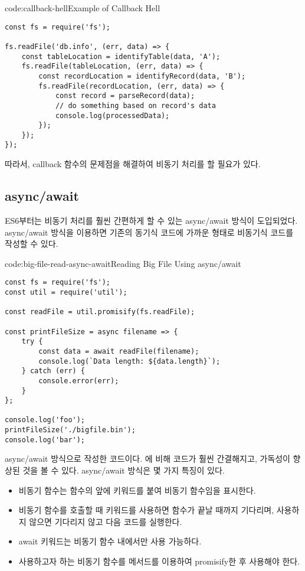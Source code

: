 \begin{codeenv}{code:callback-hell}{Example of Callback Hell}\begin{verbatim}
const fs = require('fs');

fs.readFile('db.info', (err, data) => {
    const tableLocation = identifyTable(data, 'A');
    fs.readFile(tableLocation, (err, data) => {
        const recordLocation = identifyRecord(data, 'B');
        fs.readFile(recordLocation, (err, data) => {
            const record = parseRecord(data);
            // do something based on record's data
            console.log(processedData);
        });
    });
});
\end{verbatim}
\end{codeenv}

따라서, callback 함수의 문제점을 해결하여 비동기 처리를 할 필요가 있다. 

\subsection*{async/await}

ES6부터는 비동기 처리를 훨씬 간편하게 할 수 있는 async/await 방식이 도입되었다. async/await 방식을 이용하면 기존의 동기식 코드에 가까운 형태로 비동기식 코드를 작성할 수 있다.

\begin{codeenv}{code:big-file-read-async-await}{Reading Big File Using async/await}\begin{verbatim}
const fs = require('fs');
const util = require('util');

const readFile = util.promisify(fs.readFile);

const printFileSize = async filename => {
    try {
        const data = await readFile(filename);
        console.log(`Data length: ${data.length}`);
    } catch (err) {
        console.error(err);
    }
};

console.log('foo');
printFileSize('./bigfile.bin');
console.log('bar');
\end{verbatim}
\end{codeenv}

\은 \를 async/await 방식으로 작성한 코드이다. 에 비해 코드가 훨씬 간결해지고, 가독성이 향상된 것을 볼 수 있다. async/await 방식은 몇 가지 특징이 있다. 

\begin{itemize}
    \item 비동기 함수는 함수의 앞에  키워드를 붙여 비동기 함수임을 표시한다.
    \item 비동기 함수를 호출할 때  키워드를 사용하면 함수가 끝날 때까지 기다리며, 사용하지 않으면 기다리지 않고 다음 코드를 실행한다.
    \item await 키워드는 비동기 함수 내에서만 사용 가능하다. 
    \item 사용하고자 하는 비동기 함수를  메서드를 이용하여 promisify한 후 사용해야 한다.
\end{itemize}

